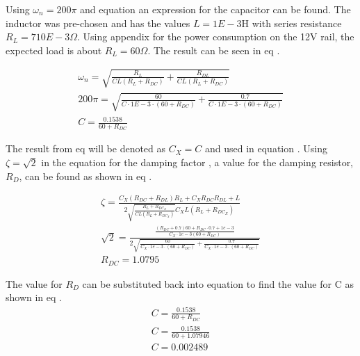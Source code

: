 Using $\omega_n = 200\pi$ and equation  an expression for the capacitor can be found. The inductor was pre-chosen and has the values $L = 1E-3$H with series resistance $R_L = 710E-3\Omega$. Using appendix  for the power consumption on the 12V rail, the expected load is about $R_L = 60 \Omega$. The result can be seen in eq .

\begin{equation}\label{eq:7_1_5_COMP1} 
    \begin{aligned}
        \omega_n = \sqrt{\frac{R_L}{CL(R_L + R_{DC})} + \frac{R_{DL}}{CL(R_L+R_{DC})}}\\
        200\pi = \sqrt{\frac{60}{C\cdot 1E-3 \cdot(60 + R_{DC})} + \frac{0.7}{C\cdot 1E-3 \cdot (60 + R_{DC})}}\\
        C = \frac{0.1538}{60 + R_{DC}}
    \end{aligned}
\end{equation}

The result from eq  will be denoted as $C_X = C$ and used in equation . Using $\zeta = \sqrt{2}$ in the equation for the damping factor , a value for the damping resistor, $R_D$, can be found as shown in eq .

\begin{equation}\label{eq:7_1_5_COMP2} 
    \begin{aligned}
        \zeta = \frac{C_X(R_{DC}+R_{DL})R_L + C_XR_{DC}R_{DL} + L}{2\sqrt{\frac{R_L +R_{DC_X}}{CL(R_L + R_{DC_X})}}C_XL(R_L+R_{DC_X})}\\
        \sqrt{2} = \frac{  \frac{(R_{DC} + 0.7)60 + R_{DC}\cdot 0.7 + 1e-3}{C_X \cdot 1e-3(60 + R_{DC})}  }{2\sqrt{ \frac{60}{C_X \cdot 1e-3 \cdot (60+R_{DC})} + \frac{0.7}{C_X \cdot 1e-3 \cdot (60+R_{DC})} }}\\
        R_{DC} = 1.0795
    \end{aligned}
\end{equation}

The value for $R_D$ can be substituted back into equation  to find the value for C as shown in eq .
\begin{equation}\label{eq:7_1_5_COMP3} 
    \begin{aligned}
        C = \frac{0.1538}{60 + R_{DC}}\\
        C = \frac{0.1538}{60 + 1.07946}\\  
        C = 0.002489
    \end{aligned}
\end{equation}

